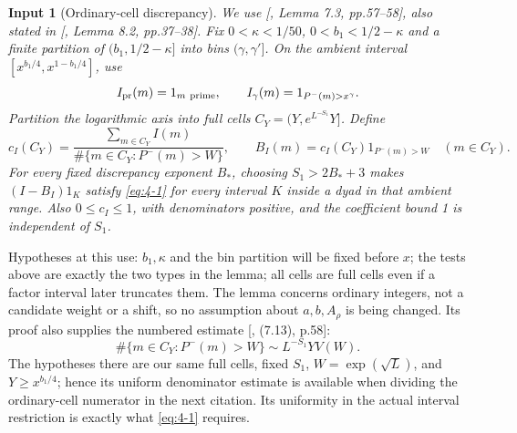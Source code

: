 \documentclass[11pt]{article}
\newtheorem{inputthm}[theorem]{Input}
\theoremstyle{definition}
\theoremstyle{definition}
\begin{document}
\begin{inputthm}[Ordinary-cell discrepancy]\label{input:proxy-discrepancy}
We use [, Lemma 7.3, pp.57--58], also stated in [, Lemma 8.2, pp.37--38]. Fix \(0<\kappa<1/50\), \(0<b_1<1/2-\kappa\) and a finite partition of \((b_1,1/2-\kappa]\) into bins \((\gamma,\gamma']\). On the ambient interval \([x^{b_1/4},x^{1-b_1/4}]\), use
\begin{equation*}
I_{\rm pr}(m)=1_{m\ {\rm prime}},\qquad
 I_\gamma(m)=1_{P^-(m)>x^\gamma}.
\end{equation*}
Partition the logarithmic axis into full cells \(C_Y=(Y,e^{L^{-S_1}}Y]\). Define
\begin{equation}
c_I(C_Y)=\frac{\sum_{m\in C_Y}I(m)}
                    {\#\{m\in C_Y:P^-(m)>W\}},\qquad
 B_I(m)=c_I(C_Y)1_{P^-(m)>W}\quad(m\in C_Y).              \tag{7.1}\label{eq:7-1}
\end{equation}
For every fixed discrepancy exponent \(B_*\), choosing \(S_1>2B_*+3\) makes
\((I-B_I)1_K\) satisfy \eqref{eq:4-1} for every interval \(K\) inside a dyad in that ambient range. Also \(0\le c_I\le1\), with denominators positive, and the coefficient bound 1 is independent of \(S_1\).

\end{inputthm}
Hypotheses at this use: \(b_1,\kappa\) and the bin partition will be fixed before \(x\); the tests above are exactly the two types in the lemma; all cells are full cells even if a factor interval later truncates them. The lemma concerns ordinary integers, not a candidate weight or a shift, so no assumption about \(a,b,A_\rho\) is being changed. Its proof also supplies the numbered estimate [, (7.13), p.58]:
\begin{equation*}
\#\{m\in C_Y:P^-(m)>W\}\sim L^{-S_1}YV(W).
\end{equation*}
The hypotheses there are our same full cells, fixed \(S_1\), \(W=\exp(\sqrt L)\), and \(Y\ge x^{b_1/4}\); hence its uniform denominator estimate is available when dividing the ordinary-cell numerator in the next citation. Its uniformity in the actual interval restriction is exactly what \eqref{eq:4-1} requires.
\end{document}
